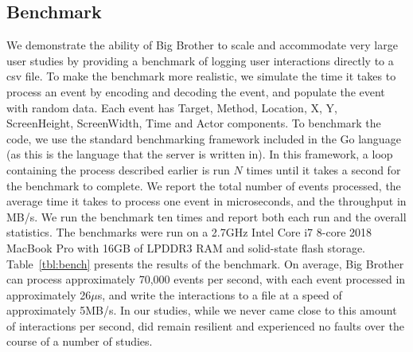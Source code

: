 \vspace{-8pt}
\subsection{Benchmark}

We demonstrate the ability of Big Brother to scale and accommodate very large user studies by providing a benchmark of logging user interactions directly to a csv file. To make the benchmark more realistic, we simulate the time it takes to process an event by encoding and decoding the event, and populate the event with random data. Each event has Target, Method, Location, X, Y, ScreenHeight, ScreenWidth, Time and Actor components. To benchmark the code, we use the standard benchmarking framework included in the Go language (as this is the language that the server is written in). In this framework, a loop containing the process described earlier is run $N$ times until it takes a second for the benchmark to complete. We report the total number of events processed, the average time it takes to process one event in microseconds, and the throughput in MB/s. We run the benchmark ten times and report both each run and the overall statistics. The benchmarks were run on a 2.7GHz Intel Core i7 8-core 2018 MacBook Pro with 16GB of LPDDR3 RAM and solid-state flash storage. Table~\ref{tbl:bench} presents the results of the benchmark. On average, Big Brother can process approximately 70,000 events per second, with each event processed in approximately 26$\mu$s, and write the interactions to a file at a speed of approximately 5MB/s. In our studies, while we never came close to this amount of interactions per second, \bb did remain resilient and experienced no faults over the course of a number of studies.


